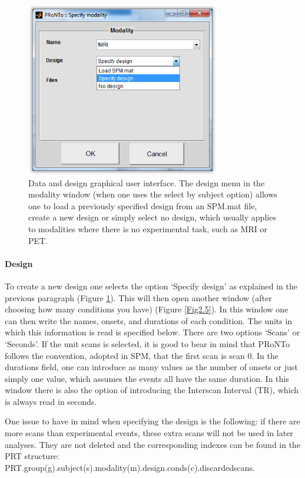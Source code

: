 \begin{figure}[!h]
  \begin{center}
      \includegraphics[height=3in]{images/Figure4.png}
   \caption{Data and design graphical user interface. The design menu in the modality window (when one uses the select by subject option) allows one to load a previously specified design from an SPM.mat file, create a new design or simply select no design, which usually applies to modalities where there is no experimental task, such as MRI or PET.}
    \label{Fig2.4}
  \end{center}
\end{figure}

\paragraph{Design} To create a new design one selects the option `Specify design' as explained in the previous paragraph (Figure \ref{Fig2.4}). This will then open another window (after choosing how many conditions you have) (Figure \ref{Fig2.5}). In this window one can then write the names, onsets, and durations of each condition. The units in which this information is read is specified below. There are two options `Scans' or `Seconds'. If the unit scans is selected, it is good to bear in mind that PRoNTo follows the convention, adopted in SPM, that the first scan is scan 0. In the durations field, one can introduce as many values as the number of onsets or just simply one value, which assumes the events all have the same duration. In this window there is also the option of introducing the Interscan Interval (TR), which is always read in seconds. 

One issue to have in mind when specifying the design is the following: if there are more scans than experimental events, these extra scans will not be used in later analyses. They are not deleted and the corresponding indexes can be found in the PRT structure: \\ PRT.group(g).subject(s).modality(m).design.conds(c).discardedscans. 

